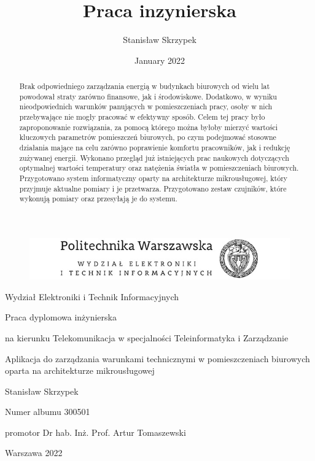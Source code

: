 \documentclass[11pt, a4]{article} %
\title{Praca inzynierska}
\author{Stanisław Skrzypek}
\date{January 2022}
\begin{document}
\begin{figure}[h]
    \centering
    \includegraphics[width=1\textwidth]{pw_logo.jpg}
    \label{fig:pw_logo}
\end{figure}

Wydział Elektroniki i Technik Informacyjnych

Praca dyplomowa inżynierska

na kierunku Telekomunikacja
w specjalności Teleinformatyka i Zarządzanie

Aplikacja do zarządzania warunkami 
technicznymi w pomieszczeniach biurowych 
oparta na architekturze mikrousługowej

Stanisław Skrzypek

Numer albumu 300501

promotor
Dr hab. Inż. Prof. Artur Tomaszewski

Warszawa 2022

\begin{abstract}
    Brak odpowiedniego zarządzania energią w budynkach biurowych od wielu lat 
    powodował straty zarówno finansowe, jak i środowiskowe. Dodatkowo, w wyniku 
    nieodpowiednich warunków panujących w pomieszczeniach pracy, osoby w nich 
    przebywające nie mogły pracować w efektywny sposób. Celem tej pracy było 
    zaproponowanie rozwiązania, za pomocą którego można byłoby mierzyć wartości 
    kluczowych parametrów pomieszczeń biurowych, po czym podejmować stosowne 
    działania mające na celu zarówno poprawienie komfortu pracowników, jak i 
    redukcję zużywanej energii. Wykonano przegląd już istniejących prac naukowych 
    dotyczących optymalnej wartości temperatury oraz natężenia światła w 
    pomieszczeniach biurowych. Przygotowano system informatyczny oparty na 
    architekturze mikrousługowej, który przyjmuje aktualne pomiary i je przetwarza. 
    Przygotowano zestaw czujników, które wykonują pomiary oraz przesyłają 
    je do systemu. 
\end{abstract}
\end{document}
